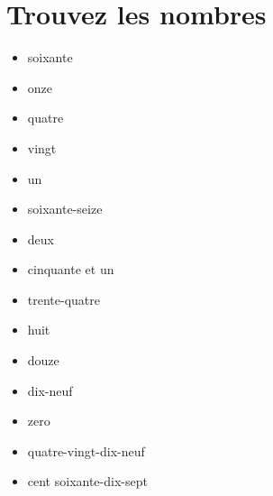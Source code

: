 \section{Trouvez les nombres}
\begin{itemize}
    \item soixante
    \item onze
    \item quatre
    \item vingt
    \item un 
    \item soixante-seize
    \item deux
    \item cinquante et un
    \item trente-quatre
    \item huit
    \item douze
    \item dix-neuf
    \item zero
    \item quatre-vingt-dix-neuf 
    \item cent soixante-dix-sept
\end{itemize}